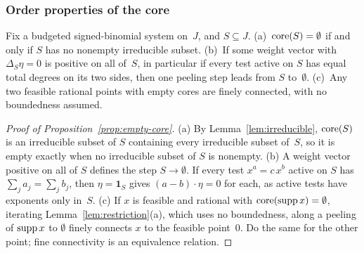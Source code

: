 \subsubsection{Order properties of the core}\label{app:core-order-proofs}

\begin{proposition}\label{prop:empty-core}
Fix a budgeted signed-binomial system on~$J$, and $S\subseteq J$.
(a)~$\operatorname{core}(S)=\emptyset$ if and only if $S$ has no nonempty irreducible
subset. (b)~If some weight vector with $\Delta_S\eta=0$ is positive on all
of~$S$, in particular if every test active on $S$ has equal total degrees
on its two sides, then one peeling step leads from $S$ to~$\emptyset$.
(c)~Any two feasible rational points with empty cores are finely
connected, with no boundedness assumed.
\end{proposition}

\begin{proof}[Proof of Proposition~\ref{prop:empty-core}]
(a) By Lemma~\ref{lem:irreducible}, $\operatorname{core}(S)$ is an irreducible subset
of $S$ containing every irreducible subset of~$S$, so it is empty exactly
when no irreducible subset of $S$ is nonempty.
(b) A weight vector positive on all of $S$ defines the step
$S\to\emptyset$. If every test $x^a=c\,x^b$ active on $S$ has
$\sum_ja_j=\sum_jb_j$, then $\eta=\mathbf 1_S$ gives $(a-b)\cdot\eta=0$
for each, as active tests have exponents only in~$S$.
(c) If $x$ is feasible and rational with $\operatorname{core}(\operatorname{supp} x)=\emptyset$,
iterating Lemma~\ref{lem:restriction}(a), which uses no boundedness,
along a peeling of $\operatorname{supp} x$ to $\emptyset$ finely connects $x$ to the
feasible point~$0$. Do the same for the other point; fine connectivity is
an equivalence relation.
\end{proof}

